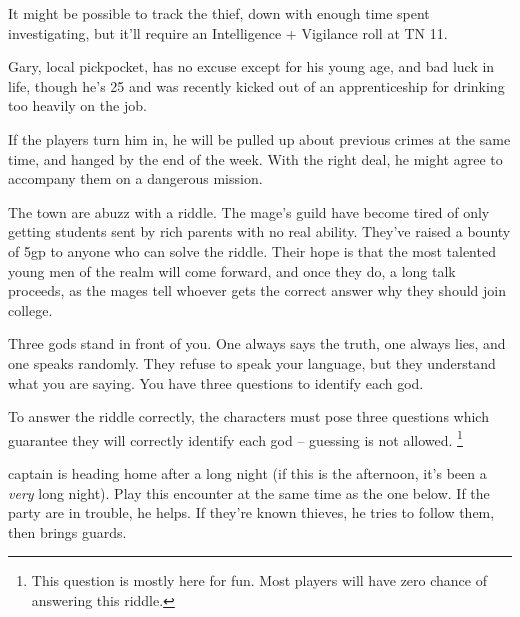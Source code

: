 \begin{multicols}{2}
It might be possible to track the thief, down with enough time spent investigating, but it'll require an Intelligence + Vigilance roll at TN 11.

Gary, local pickpocket, has no excuse except for his young age, and bad luck in life, though he's 25 and was recently kicked out of an apprenticeship for drinking too heavily on the job.

If the players turn him in, he will be pulled up about previous crimes at the same time, and hanged by the end of the week.
With the right deal, he might agree to accompany them on a dangerous mission.

\vfill\null



The town are abuzz with a riddle.  The mage's guild have become tired of only getting students sent by rich parents with no real ability.  They've raised a bounty of 5gp to anyone who can solve the riddle.  Their hope is that the most talented young men of the realm will come forward, and once they do, a long talk proceeds, as the mages tell whoever gets the correct answer why they should join \gls{college}.

\begin{boxtext}
Three gods stand in front of you.  One always says the truth, one always lies, and one speaks randomly.  They refuse to speak your language, but they understand what you are saying.  You have three questions to identify each god.
\end{boxtext}

To answer the riddle correctly, the characters must pose three questions which guarantee they will correctly identify each god -- guessing is not allowed.
\footnote{This question is mostly here for fun.  Most players will have zero chance of answering this riddle.}


\captain

\Gls{captain} is heading home after a long night (if this is the afternoon, it's been a \emph{very} long night).  Play this encounter at the same time as the one below.  If the party are in trouble, he helps.  If they're known thieves, he tries to follow them, then brings guards.



\end{multicols}
